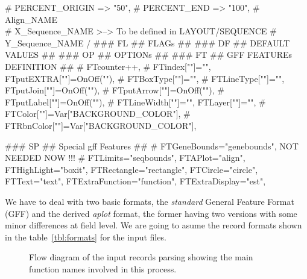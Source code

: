 \documentclass[11pt]{article}
\def\nwendcode{\endtrivlist \endgroup} %
\let\nwdocspar=\par                    %
\begin{document}
\nwenddocs{}\endmoddef
# PERCENT_ORIGIN => "50",
# PERCENT_END => "100",
# Align_NAME       \\
# X_Sequence_NAME   >--> To be defined in LAYOUT/SEQUENCE
# Y_Sequence_NAME  /
### FL ## FLAGs ##
### DF ## DEFAULT VALUES ##
### OP ## OPTIONs ##
### FT ## GFF FEATUREs DEFINITION ##
  # FTcounter++,
  # FTindex[""]="",
  FTputEXTRA[""]=OnOff(""),
  # FTBoxType[""]="",
  # FTLineType[""]="",
  FTputJoin[""]=OnOff(""),
  # FTputArrow[""]=OnOff(""),
  # FTputLabel[""]=OnOff(""),
  # FTLineWidth[""]="",
  FTLayer[""]="",
  # FTColor[""]=Var["BACKGROUND_COLOR"],
  # FTRbnColor[""]=Var["BACKGROUND_COLOR"],
\nwendcode{}\nwdocspar

\nwenddocs{}\plusendmoddef
### SP ## Special gff Features ##
  # FTGeneBounds="genebounds", NOT NEEDED NOW !!!
  # FTLimits="seqbounds",
  FTAPlot="align",
  FTHighLight="boxit",
  FTRectangle="rectangle",
  FTCircle="circle",
  FTText="text",
  FTExtraFunction="function",
  FTExtraDisplay="est",
\nwendcode{}\nwdocspar
 

\newpage


We have to deal with two basic formats, the \textsl{standard} General Feature Format (GFF) and the derived \textsl{aplot} format, the former having two versions with some minor differences at field level. We are going to asume the record formats shown in the table~\ref{tbl:formats} for the input files.


\label{todo:EEA}\label{todo:EEB}
\nwenddocs{}%
%
%
%
%
%
%
\nwdocspar
\nwenddocs{}%
%
%
\nwdocspar
\todo{ \item \todoEEA 
       \item \todoEEB } %


\begin{figure}[!t]
\begin{center}
\fbox{\parbox[c][8cm][c]{\linewidth}{\hfill}}
\caption[Flow diagram of the input records parsing.]{\label{fig:parsingGFF} Flow diagram of the input records parsing showing the main function names involved in this process.}
\end{center}
\end{figure}
\end{document}
